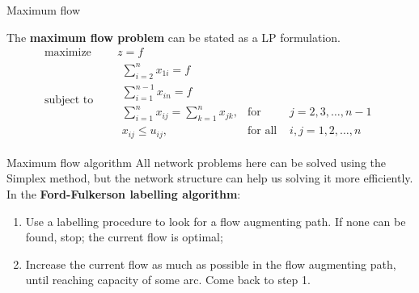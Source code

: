 \documentclass{beamer}
\begin{document}
\begin{frame}[allowframebreaks]{Maximum flow}
\begin{center}
\end{center}
The {\bf maximum flow problem} can be stated as a LP formulation. 
\begin{equation*}
  \begin{aligned}
    \text{maximize } \quad & z = f \\
    \text{subject to }\quad &
    \begin{array}{rcl}
      \sum_{i=2}^n x_{1i}= f&& \\
      \sum_{i=1}^{n-1} x_{in} = f &&\\
      \sum_{i=1}^n x_{ij} = \sum_{k=1}^n x_{jk}, & \text{for } & j=2,3,\ldots,n-1\\
      x_{ij} \leq u_{ij}, & \text{for all } & i,j=1,2,\ldots,n
    \end{array}
  \end{aligned}
\end{equation*}
\end{frame}

\begin{frame}{Maximum flow algorithm}
  All network problems here can be solved using the Simplex method, but the network structure can help us solving it more efficiently. In the {\bf Ford-Fulkerson labelling algorithm}:
  \begin{enumerate}
    \item Use a labelling procedure to look for a flow augmenting path. If none can be found, stop; the current flow is optimal;
    \item Increase the current flow as much as possible in the flow augmenting path, until reaching capacity of some arc. Come back to step 1.
  \end{enumerate}
\end{frame}
\end{document}
